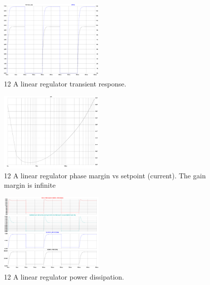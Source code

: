 \section{}\label{sec:hardware_images}
\FloatBarrier
\begin{figure}[h!]
    \centering
    \includegraphics[width=0.45\textwidth]{LT3080-1_Transient-response.pdf}
    \caption{12 A linear regulator transient response.}
    \label{fig:LT3080-1_Transient-response}
\end{figure}

\begin{figure}[h!]
    \centering
    \includegraphics[width=0.45\textwidth]{LT3080-1_Phase-margin_VS_setpoint.pdf}
    \caption{12 A linear regulator phase margin vs setpoint (current). The gain margin is infinite}
    \label{fig:LT3080-1_Phase-margin_VS_setpoint}
\end{figure}

\begin{figure}[h!]
    \centering
    \includegraphics[width=0.45\textwidth]{LT3080-1_PowerDissipation.pdf}
    \caption{12 A linear regulator power dissipation.}
    \label{fig:LT3080-1_PowerDissipation}
\end{figure}

